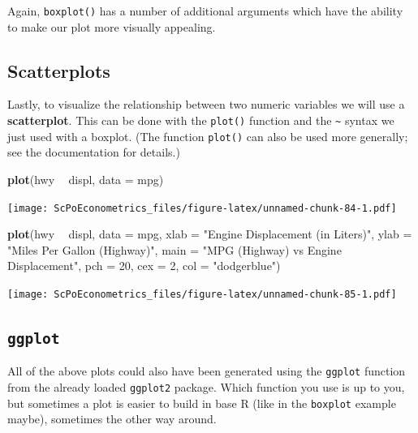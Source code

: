 \documentclass[]{book}
\newenvironment{Shaded}{\begin{snugshade}}{\end{snugshade}}
\newcommand{\KeywordTok}[1]{\textcolor[rgb]{0.13,0.29,0.53}{\textbf{#1}}}
\newcommand{\DataTypeTok}[1]{\textcolor[rgb]{0.13,0.29,0.53}{#1}}
\newcommand{\DecValTok}[1]{\textcolor[rgb]{0.00,0.00,0.81}{#1}}
\newcommand{\StringTok}[1]{\textcolor[rgb]{0.31,0.60,0.02}{#1}}
\newcommand{\OperatorTok}[1]{\textcolor[rgb]{0.81,0.36,0.00}{\textbf{#1}}}
\newcommand{\NormalTok}[1]{#1}
\theoremstyle{definition}
\theoremstyle{definition}
\theoremstyle{definition}
\theoremstyle{remark}
\begin{document}
Again, \texttt{boxplot()} has a number of additional arguments which
have the ability to make our plot more visually appealing.

\subsection{Scatterplots}\label{scatterplots}

Lastly, to visualize the relationship between two numeric variables we
will use a \textbf{scatterplot}. This can be done with the
\texttt{plot()} function and the \texttt{\textasciitilde{}} syntax we
just used with a boxplot. (The function \texttt{plot()} can also be used
more generally; see the documentation for details.)

\begin{Shaded}
\begin{Highlighting}[]
\KeywordTok{plot}\NormalTok{(hwy }\OperatorTok{~}\StringTok{ }\NormalTok{displ, }\DataTypeTok{data =}\NormalTok{ mpg)}
\end{Highlighting}
\end{Shaded}

\texttt{[image: ScPoEconometrics\_files/figure-latex/unnamed-chunk-84-1.pdf]}

\begin{Shaded}
\begin{Highlighting}[]
\KeywordTok{plot}\NormalTok{(hwy }\OperatorTok{~}\StringTok{ }\NormalTok{displ, }\DataTypeTok{data =}\NormalTok{ mpg,}
     \DataTypeTok{xlab =} \StringTok{"Engine Displacement (in Liters)"}\NormalTok{,}
     \DataTypeTok{ylab =} \StringTok{"Miles Per Gallon (Highway)"}\NormalTok{,}
     \DataTypeTok{main =} \StringTok{"MPG (Highway) vs Engine Displacement"}\NormalTok{,}
     \DataTypeTok{pch  =} \DecValTok{20}\NormalTok{,}
     \DataTypeTok{cex  =} \DecValTok{2}\NormalTok{,}
     \DataTypeTok{col  =} \StringTok{"dodgerblue"}\NormalTok{)}
\end{Highlighting}
\end{Shaded}

\texttt{[image: ScPoEconometrics\_files/figure-latex/unnamed-chunk-85-1.pdf]}

\subsection{\texorpdfstring{\texttt{ggplot}}{ggplot}}\label{ggplot}

All of the above plots could also have been generated using the
\texttt{ggplot} function from the already loaded \texttt{ggplot2}
package. Which function you use is up to you, but sometimes a plot is
easier to build in base R (like in the \texttt{boxplot} example maybe),
sometimes the other way around.
\end{document}
